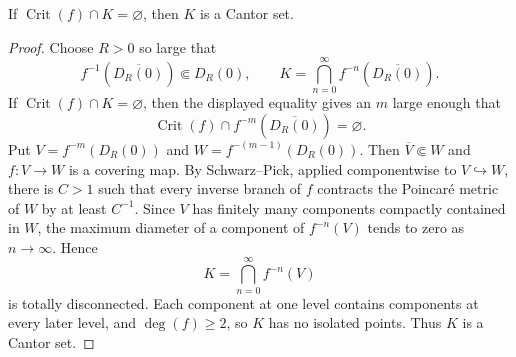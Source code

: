 \documentclass[11pt,a4paper]{article}
\begin{document}
\begin{corollary}\label{cd5:cantor}
If $\operatorname{Crit}(f)\cap K=\varnothing$, then $K$ is a Cantor set.
\end{corollary}
\begin{proof}
Choose $R>0$ so large that
\[
f^{-1}(\overline{D_R(0)})\Subset D_R(0),
\qquad
K=\bigcap_{n=0}^{\infty}f^{-n}(\overline{D_R(0)}).
\]
If $\operatorname{Crit}(f)\cap K=\varnothing$, then the displayed equality gives an $m$ large enough that
\[
\operatorname{Crit}(f)\cap f^{-m}(\overline{D_R(0)})=\varnothing.
\]
Put $V=f^{-m}(D_R(0))$ and $W=f^{-(m-1)}(D_R(0))$. Then $\overline V\Subset W$ and $f\colon V\to W$ is a covering map. By Schwarz--Pick, applied componentwise to $V\hookrightarrow W$, there is $C>1$ such that every inverse branch of $f$ contracts the Poincar\'e metric of $W$ by at least $C^{-1}$. Since $V$ has finitely many components compactly contained in $W$, the maximum diameter of a component of $f^{-n}(V)$ tends to zero as $n\to\infty$. Hence
\[
K=\bigcap_{n=0}^{\infty}f^{-n}(V)
\]
is totally disconnected. Each component at one level contains components at every later level, and $\deg(f)\ge2$, so $K$ has no isolated points. Thus $K$ is a Cantor set.
\end{proof}
\end{document}
